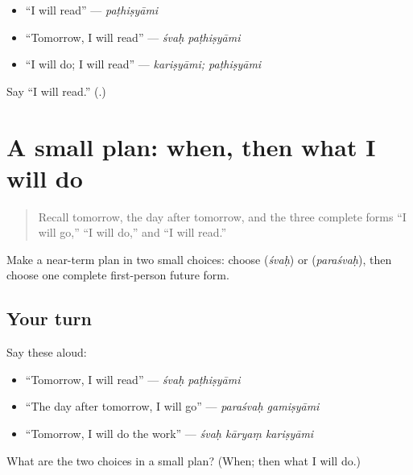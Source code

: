 \begin{itemize}
\raggedright
  \item “I will read” — \emph{paṭhiṣyāmi}
  \item “Tomorrow, I will read” — \emph{śvaḥ paṭhiṣyāmi}
  \item “I will do; I will read” — \emph{kariṣyāmi; paṭhiṣyāmi}
\end{itemize}

\begin{tcolorbox}[breakable,colback=teal!4,colframe=teal!35!black,title={Before you move on}]
Say “I will read.” (\textbf{}.)
\end{tcolorbox}
\section[(near-term first-person plan)]{A small plan: when, then what I will do}

\label{lesson:SA-C264-near-term-plan}



\begin{quote}
Recall tomorrow, the day after tomorrow, and the three complete forms “I will go,” “I will do,” and “I will read.”
\end{quote}

\begin{grammarlens}[title={Grammar Lens: time first, plan second}]
Make a near-term plan in two small choices: choose \textbf{} (\emph{śvaḥ}) or \textbf{} (\emph{paraśvaḥ}), then choose one complete first-person future form.
\end{grammarlens}

\subsection*{Your turn}
Say these aloud:

\begin{itemize}
\raggedright
  \item “Tomorrow, I will read” — \emph{śvaḥ paṭhiṣyāmi}
  \item “The day after tomorrow, I will go” — \emph{paraśvaḥ gamiṣyāmi}
  \item “Tomorrow, I will do the work” — \emph{śvaḥ kāryaṃ kariṣyāmi}
\end{itemize}

\begin{tcolorbox}[breakable,colback=teal!4,colframe=teal!35!black,title={Before you move on}]
What are the two choices in a small plan? (When; then what I will do.)
\end{tcolorbox}
